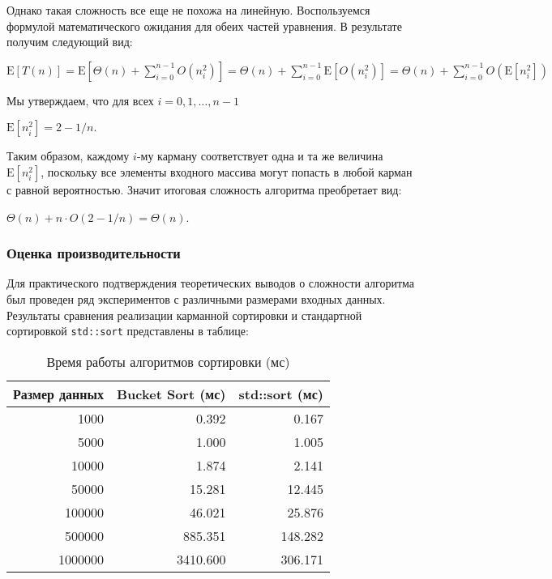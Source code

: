 \documentclass[12pt]{article}
\begin{document}
Однако такая сложность все еще не похожа на линейную. Воспользуемся формулой математического ожидания для обеих частей уравнения. В результате получим следующий вид:
\begin{center}
    $\mathrm{E}[T(n)] = \mathrm{E}\left[\Theta(n) + \sum_{i=0}^{n-1} O\left(n_i^2\right)\right] = \Theta(n) + \sum_{i=0}^{n-1} \mathrm{E}\left[O\left(n_i^2\right)\right] = \Theta(n) + \sum_{i=0}^{n-1} O\left(\mathrm{E}\left[n_i^2\right]\right)$
\end{center}

Мы утверждаем, что для всех $i = 0, 1, \ldots, n - 1$
\begin{center}
    $\mathrm{E}\left[n_i^2\right] = 2 - 1/n.$
\end{center}

Таким образом, каждому $i$-му карману соответствует одна и та же величина $\mathrm{E}\left[n_i^2\right]$, поскольку все элементы входного массива могут попасть в любой карман с равной вероятностью. Значит итоговая сложность алгоритма преобретает вид:
\begin{center}
    $\Theta(n) + n \cdot O(2-1/n) = \Theta(n)$.
\end{center}

\subsubsection*{Оценка производительности}

Для практического подтверждения теоретических выводов о сложности алгоритма был проведен ряд экспериментов с различными размерами входных данных. Результаты сравнения реализации карманной сортировки и стандартной сортировкой \texttt{std::sort} представлены в таблице:

\benchmarkdata

\begin{table}[h]
\centering
\caption{Время работы алгоритмов сортировки (мс)}
\begin{tabular}{r|r|r}
\hline
\textbf{Размер данных} & \textbf{Bucket Sort (мс)} & \textbf{std::sort (мс)} \\
\hline
1000 & 0.392 & 0.167 \\
5000 & 1.000 & 1.005 \\
10000 & 1.874 & 2.141 \\
50000 & 15.281 & 12.445 \\
100000 & 46.021 & 25.876 \\
500000 & 885.351 & 148.282 \\
1000000 & 3410.600 & 306.171 \\
\hline
\end{tabular}
\end{table}
\end{document}
